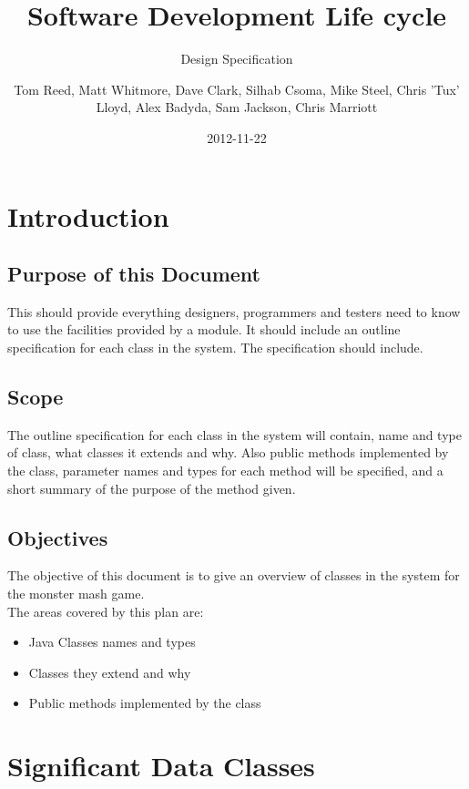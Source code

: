 \documentclass{project}
\begin{document}
\title{Software Development Life cycle}
\subtitle{Design Specification}
\author{Tom Reed, Matt Whitmore, Dave Clark, Silhab Csoma, Mike Steel, Chris 'Tux' Lloyd, Alex Badyda, Sam Jackson, Chris Marriott}
\date{2012-11-22}
\maketitle
\tableofcontents
\newpage
\section{Introduction}
\subsection{Purpose of this Document}
This should provide everything designers, programmers and testers need to know to use the facilities
provided by a module. It should include an outline specification for each class in the system. The specification
should include.

\subsection{Scope}
The outline specification for each class in the system will contain, name and type of class, what classes it extends and why. Also public methods implemented by the class, parameter names and types for each method will be specified, and a short summary of the purpose of the method given.

\subsection{Objectives}
The objective of this document is to give an overview of classes in the system for the monster mash game.
\\
The areas covered by this plan are:
\begin{itemize}
	\item Java Classes names and types
	\item Classes they extend and why
	\item Public methods implemented by the class
\end{itemize}

\section{Significant Data Classes}
\end{document}
